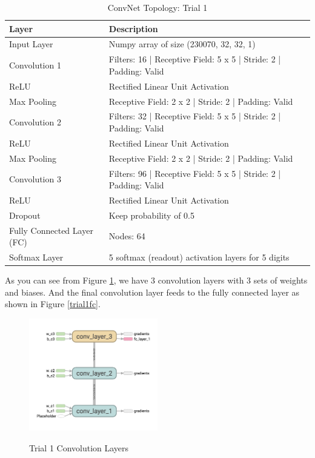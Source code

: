 \documentclass[twoside, column]{article}
\begin{document}
\begin{table}[htp]
\caption{ConvNet Topology: Trial 1}
\begin{center}
\begin{tabular}{llr}

\cmidrule(r){1-2}
Layer & Description \\
\midrule
Input Layer & Numpy array of size (230070, 32, 32, 1)\\
Convolution 1 & Filters: 16 | Receptive Field: 5 x 5 | Stride: 2 | Padding: Valid\\
ReLU & Rectified Linear Unit Activation\\
Max Pooling & Receptive Field: 2 x 2 | Stride: 2 | Padding: Valid\\
Convolution 2 & Filters: 32 | Receptive Field: 5 x 5 | Stride: 2 | Padding: Valid\\
ReLU & Rectified Linear Unit Activation\\
Max Pooling & Receptive Field: 2 x 2 | Stride: 2 | Padding: Valid\\
Convolution 3 & Filters: 96 | Receptive Field: 5 x 5 | Stride: 2 | Padding: Valid\\
ReLU & Rectified Linear Unit Activation\\
Dropout & Keep probability of 0.5\\
Fully Connected Layer (FC) & Nodes: 64\\
Softmax Layer & 5 softmax (readout) activation layers for 5 digits\\

\end{tabular}
\end{center}
\label{trial1topology}
\end{table}

As you can see from Figure \ref{trial1convlayers}, we have 3 convolution layers with 3 sets of weights and biases. And the final convolution layer feeds to the fully connected layer as shown in Figure \ref{trial1fc}.

\begin{figure}
\caption{Trial 1 Convolution Layers}
\centering
\includegraphics[width=0.5\textwidth]{conv_trial_1}
\label{trial1convlayers}
\end{figure}
\end{document}
